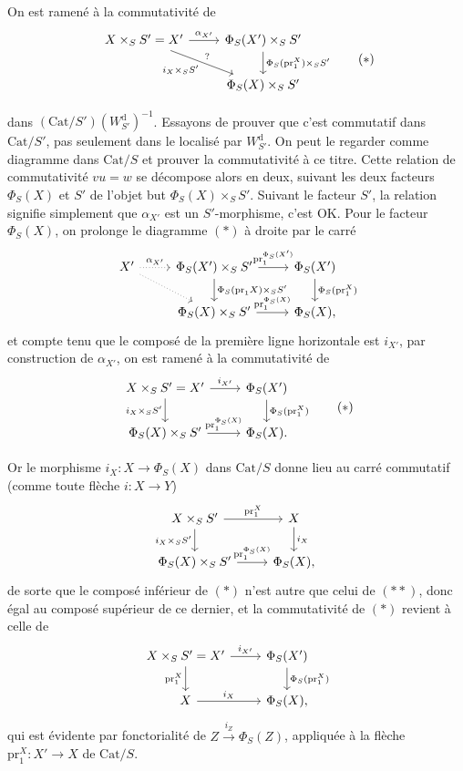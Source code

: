 \documentclass[11pt]{article}
\newcommand{\printedpage}[1]{\marginpar{\footnotesize p.~#1}}
\newcommand{\msp}[1]{\marginpar{\footnotesize [#1]}}
\newcommand{\Cat}{\mathrm{Cat}}
\newcommand{\pr}{\mathrm{pr}}
\newcommand{\dd}{\mathrm{d}}
\begin{document}
\leavevmode\msp{page 145}On est ramené à la commutativité de
\[
\begin{tikzcd}
X\times_S S' = X' \arrow[r, "{\alpha_{X'}}"] \arrow[dr, "i_X\times_S S'"', "?"] & \Phi_S(X')\times_S S' \arrow[d, "\Phi_S(\pr_1^X)\times_S S'"] \\
 & \Phi_S(X)\times_S S'
\end{tikzcd}
\tag*{$(*)$}
\]

\printedpage{89}

dans $(\Cat/S')(W^{\dd}_{S'})^{-1}$. Essayons de prouver que c'est commutatif dans $\Cat/S'$, pas seulement dans le localisé par $W^{\dd}_{S'}$. On peut le regarder comme diagramme dans $\Cat/S$ et prouver la commutativité à ce titre. Cette relation de commutativité $vu = w$ se décompose alors en deux, suivant les deux facteurs $\Phi_S(X)$ et $S'$ de l'objet but $\Phi_S(X) \times_S S'$. Suivant le facteur $S'$, la relation signifie simplement que $\alpha_{X'}$ est un $S'$-morphisme, c'est OK. Pour le facteur $\Phi_S(X)$, on prolonge le diagramme $(*)$ à droite par le carré
\[
\begin{tikzcd}
X' \arrow[r, dotted, "\alpha_{X'}"] \arrow[dr, dotted] & \Phi_S(X') \times_S S' \arrow[r, "\pr_1^{\Phi_S(X')}"] \arrow[d, "\Phi_S(\pr_1 X)\times_S S'"] & \Phi_S(X') \arrow[d, "\Phi_S(\pr_1^X)"] \\
 & \Phi_S(X) \times_S S' \arrow[r, "\pr_1^{\Phi_S(X)}"] & \Phi_S(X),
\end{tikzcd}
\] %
\msp{page 146}
et compte tenu que le composé de la première ligne horizontale est $i_{X'}$, par construction de $\alpha_{X'}$, on est ramené à la commutativité de
\[
\begin{tikzcd}
X \times_S S' = X' \arrow[r, "i_{X'}"] \arrow[d, "i_X\times_S S'"'] & \Phi_S(X') \arrow[d, "\Phi_S(\pr_1^X)"] \\
\Phi_S(X) \times_S S' \arrow[r, "\pr_1^{\Phi_S(X)}"] & \Phi_S(X).
\end{tikzcd}
\tag*{$(*)$}
\]

Or le morphisme $i_X : X \longrightarrow \Phi_S(X)$ dans $\Cat/S$ donne lieu au carré commutatif (comme toute flèche $i : X \longrightarrow Y$)
\[
\begin{tikzcd}
X \times_S S' \arrow[r, "\pr_1^X"] \arrow[d, "i_X\times_S S'"'] & X \arrow[d, "i_X"] \\
\Phi_S(X) \times_S S' \arrow[r, "\pr_1^{\Phi_S(X)}"] & \Phi_S(X),
\end{tikzcd}
\]
de sorte que le composé inférieur de $(*)$ n'est autre que celui de $(**)$, donc égal au composé supérieur de ce dernier, et la commutativité de $(*)$ revient à celle de
\[
\begin{tikzcd}
X \times_S S' = X' \arrow[r, "i_{X'}"] \arrow[d, "\pr_1^X"'] & \Phi_S(X') \arrow[d, "\Phi_S(\pr_1^X)"] \\
X \arrow[r, "i_X"] & \Phi_S(X),
\end{tikzcd}
\]
qui est évidente par fonctorialité de $Z \xrightarrow{i_Z} \Phi_S(Z)$, appliquée à la flèche $\pr_1^X : X' \longrightarrow X$ de $\Cat/S$.
\end{document}
